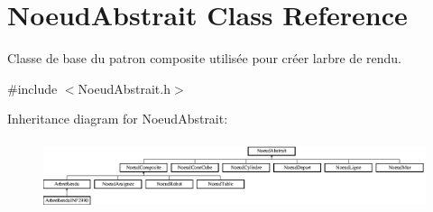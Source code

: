\hypertarget{class_noeud_abstrait}{}\section{Noeud\+Abstrait Class Reference}
\label{class_noeud_abstrait}


Classe de base du patron composite utilisée pour créer l\textquotesingle{}arbre de rendu.  




{\ttfamily \#include $<$Noeud\+Abstrait.\+h$>$}

Inheritance diagram for Noeud\+Abstrait\+:\begin{figure}[H]
\begin{center}
\leavevmode
\includegraphics[height=2.043796cm]{class_noeud_abstrait}
\end{center}
\end{figure}
